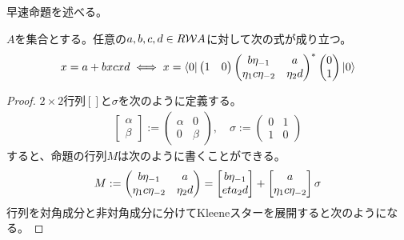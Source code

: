 {	早速命題を述べる。

	\begin{proposition}[二次方程式の摂動展開]\label{prop:二次方程式の摂動展開} %
		$A$を集合とする。任意の$a,b,c,d\in R{{\mathcal{W}}} A$に対して次の式が成り立つ。
		\begin{equation*}\begin{split}
			x = a + bxcxd \iff x = \mathinner{\langle{0}|}\begin{pmatrix}
				1 & 0
			\end{pmatrix}\begin{pmatrix}
				b\eta_{-1} & a \\ \eta_{1}c\eta_{-2} & \eta_2d
			\end{pmatrix}^*\begin{pmatrix}
				0 \\ 1
			\end{pmatrix}\mathinner{|{0}\rangle}
		\end{split}\end{equation*}
	\end{proposition} %
	\begin{proof} %
		$2\times 2$行列$[]$と$\sigma$を次のように定義する。
		\begin{equation*}\begin{split}
			\begin{bmatrix}
				\alpha \\ \beta
			\end{bmatrix} := \begin{pmatrix}
				\alpha & 0 \\ 0 & \beta
			\end{pmatrix},\quad \sigma := \begin{pmatrix}
				0 & 1 \\ 1 & 0
			\end{pmatrix}
		\end{split}\end{equation*}
		すると、命題の行列$M$は次のように書くことができる。
		\begin{equation*}\begin{split}
			M := \begin{pmatrix}
				b\eta_{-1} & a \\ \eta_{1}c\eta_{-2} & \eta_2d
			\end{pmatrix} 
			= \begin{bmatrix}{b\eta_{-1}}\\{eta_2d}\end{bmatrix} + \begin{bmatrix}{a}\\{\eta_{1}c\eta_{-2}}\end{bmatrix}\sigma
		\end{split}\end{equation*}
		行列を対角成分と非対角成分に分けてKleeneスターを展開すると次のようになる。

\end{proof}}
